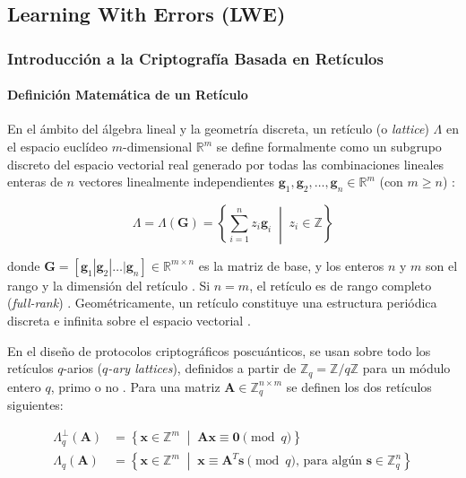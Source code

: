 \subsection{Learning With Errors (LWE)}

\subsubsection{Introducción a la Criptografía Basada en Retículos}

\paragraph{Definición Matemática de un Retículo}

En el ámbito del álgebra lineal y la geometría discreta, un retículo (o \textit{lattice}) $\Lambda$ en el espacio euclídeo $m$-dimensional $\mathbb{R}^m$ se define formalmente como un subgrupo discreto del espacio vectorial real generado por todas las combinaciones lineales enteras de $n$ vectores linealmente independientes $\mathbf{g}_1, \mathbf{g}_2, \dots, \mathbf{g}_n \in \mathbb{R}^m$ (con $m \ge n$) \cite{huang2018lattice, ma2026laasso}:

\begin{equation}
\Lambda = \Lambda(\mathbf{G}) = \left\{ \sum_{i=1}^{n} z_i \mathbf{g}_i \;\middle|\; z_i \in \mathbb{Z} \right\}
\end{equation}

donde $\mathbf{G} = [\mathbf{g}_1 | \mathbf{g}_2 | \dots | \mathbf{g}_n] \in \mathbb{R}^{m \times n}$ es la matriz de base, y los enteros $n$ y $m$ son el rango y la dimensión del retículo \cite{huang2018lattice}. Si $n = m$, el retículo es de rango completo (\textit{full-rank}) \cite{ma2026laasso}. Geométricamente, un retículo constituye una estructura periódica discreta e infinita sobre el espacio vectorial \cite{huang2018lattice}.

En el diseño de protocolos criptográficos poscuánticos, se usan sobre todo los retículos $q$-arios (\textit{$q$-ary lattices}), definidos a partir de $\mathbb{Z}_q = \mathbb{Z}/q\mathbb{Z}$ para un módulo entero $q$, primo o no \cite{huang2018lattice, an2023secrethandshakes}. Para una matriz $\mathbf{A} \in \mathbb{Z}_q^{n \times m}$ se definen los dos retículos siguientes:

\begin{align}
\Lambda_q^\perp(\mathbf{A}) &= \left\{ \mathbf{x} \in \mathbb{Z}^m \;\middle|\; \mathbf{A}\mathbf{x} \equiv \mathbf{0} \pmod q \right\} \label{eq:q_ary_perp} \\
\Lambda_q(\mathbf{A}) &= \left\{ \mathbf{x} \in \mathbb{Z}^m \;\middle|\; \mathbf{x} \equiv \mathbf{A}^T\mathbf{s} \pmod q, \, \text{para algún } \mathbf{s} \in \mathbb{Z}_q^n \right\}
\end{align}

